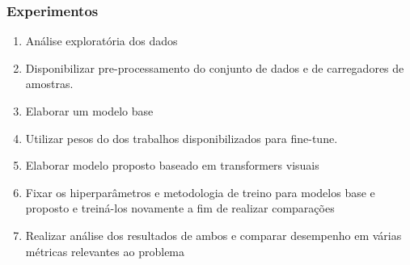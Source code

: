 \documentclass{beamer}
\begin{document}
\begin{frame}
    \frametitle{Experimentos}
    \begin{enumerate}
        \item   Análise exploratória dos dados
        \item   Disponibilizar pre-processamento do conjunto de dados e de carregadores de amostras.
        \item   Elaborar um modelo base
        \item   Utilizar pesos do dos trabalhos disponibilizados para fine-tune. 
        \item   Elaborar modelo proposto baseado em transformers visuais
        \item   Fixar os hiperparâmetros e metodologia de treino para modelos base e proposto e treiná-los novamente a fim de realizar comparações
        \item   Realizar análise dos resultados de ambos e comparar desempenho em várias métricas relevantes ao problema
        \end{enumerate}
        
\end{frame}
\end{document}
